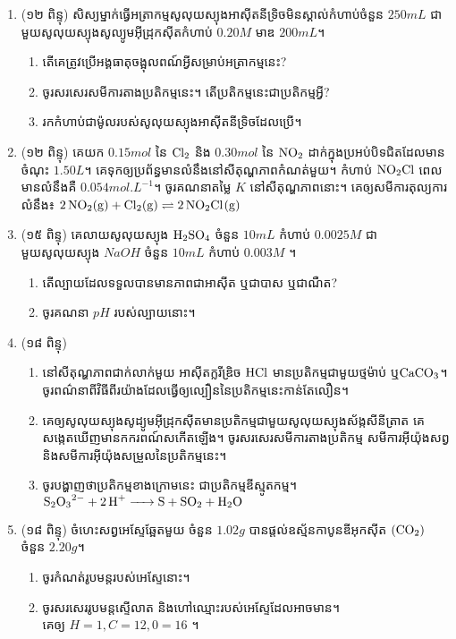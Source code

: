 \documentclass{officialexam}
\begin{document}
\begin{enumerate}[I]
	\item {\color{khtug}(១២ ពិន្ទុ)} សិស្យម្នាក់ធ្វើអត្រាកម្មសូលុយស្យុងអាសុីតនីទ្រិចមិនស្គាល់កំហាប់ចំនួន $250mL$ ជាមួយសូលុយស្យុងសូល្យូមអុីដ្រុកសុីតកំហាប់ $0.20M$ មាឌ $200mL$។
	\begin{enumerate}[k]
		\item តើគេត្រូវប្រើអង្គធាតុចង្អុលពណ៍អ្វីសម្រាប់អត្រាកម្មនេះ?
		\item ចូរសរសេរសមីការតាងប្រតិកម្មនេះ។ តើប្រតិកម្មនេះជាប្រតិកម្មអ្វី?
		\item រកកំហាប់ជាម៉ូលរបស់សូលុយស្យុងអាសុីតនីទ្រិចដែលប្រើ។
	\end{enumerate}
	\item {\color{khtug}(១២ ពិន្ទុ)} គេយក $0.15mol$ នៃ $\ce{Cl2}$ និង $0.30mol$ នៃ $\ce{NO2}$ ដាក់ក្នុងប្រអប់បិទជិតដែលមានចំណុះ $1.50L$។ គេទុកឲ្យប្រព័ន្ធមានលំនឹងនៅសីតុណ្ហភាពកំណត់មួយ។ កំហាប់ $\ce{NO2Cl}$ ពេលមានលំនឹងគឺ $0.054mol.L^{-1}$។ ចូរគណនាតម្លៃ $K$ នៅសីតុណ្ហភាពនោះ។ គេឲ្យសមីការតុល្យការលំនឹង៖ $\ce{2NO2_(g) + Cl2_(g)} \rightleftharpoons \ce{2NO2Cl_(g)}$
	\item {\color{khtug}(១៥ ពិន្ទុ)} គេលាយសូលុយស្យុង $\ce{H2SO4}$ ចំនួន $10mL$ កំហាប់ $0.0025M$ ជាមួយសូលុយស្យុង $NaOH$ ចំនួន $10mL$ កំហាប់ $0.003M$ ។
	\begin{enumerate}[k]
		\item តើល្បាយដែលទទួលបានមានភាពជាអាស៊ីត ឬជាបាស ឬជាណឺត?
		\item ចូរគណនា $pH$ របស់ល្បាយនោះ។
	\end{enumerate}
	\item {\color{khtug}(១៨ ពិន្ទុ)}​\begin{enumerate}[k]
		\item នៅសីតុណ្ហភាពជាក់លាក់មួយ អាសុីតក្លរីឌ្រិច $\ce{HCl}$ មានប្រតិកម្មជាមួយថ្មម៉ាប់ ឬ$\ce{CaCO3}$។\\
		ចូរពណ៌នាពីវិធីពីរយ៉ាងដែលធ្វើឲ្យល្បឿននៃប្រតិកម្មនេះកាន់តែលឿន។
		\item គេឲ្យសូលុយស្យុងសូដ្យូមអុីដ្រុកសុីតមានប្រតិកម្មជាមួយសូលុយស្យុងស័ង្កសីនីត្រាត គេសង្កេតឃើញមានកករពណ៍សកើតឡើង។ ចូរសរសេរសមីការតាងប្រតិកម្ម សមីការអុីយ៉ុងសព្វ និងសមីការអុីយ៉ុងសម្រួលនៃប្រតិកម្មនេះ។
		\item ចូរបង្ហាញថាប្រតិកម្មខាងក្រោមនេះ ជាប្រតិកម្មឌីស្មូតកម្ម។
		 $\ce{S2O3^{2-} + 2H^{+} -> S + SO2 + H2O}$ 
	\end{enumerate}
	\item {\color{khtug}(១៨ ពិន្ទុ)} ចំហេះសព្វអេស្ទែឆ្អែតមួយ ចំនួន $1.02g$ បានផ្តល់ឧស្ម័នកាបូនឌីអុកសុីត $\ce{(CO2)}$ ចំនួន $2.20g$។
	\begin{enumerate}[k]
		\item ចូរកំណត់រូបមន្តរបស់អេស្ទែនោះ។
		\item ចូរសរសេររូបមន្តស្ទើលាត និងហៅឈ្មោះរបស់អេស្ទែដែលអាចមាន។\\
		គេឲ្យ $H=1, C=12, 0=16$ ។
	\end{enumerate}
\end{enumerate}
\end{document}
